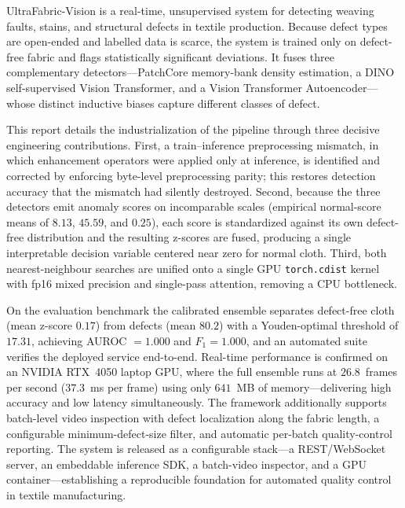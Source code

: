 \vspace{-1cm}


UltraFabric-Vision is a real-time, unsupervised system for detecting weaving faults, stains, and structural defects in textile production. Because defect types are open-ended and labelled data is scarce, the system is trained only on defect-free fabric and flags statistically significant deviations. It fuses three complementary detectors---PatchCore memory-bank density estimation, a DINO self-supervised Vision Transformer, and a Vision Transformer Autoencoder---whose distinct inductive biases capture different classes of defect.

This report details the industrialization of the pipeline through three decisive engineering contributions. First, a train--inference preprocessing mismatch, in which enhancement operators were applied only at inference, is identified and corrected by enforcing byte-level preprocessing parity; this restores detection accuracy that the mismatch had silently destroyed. Second, because the three detectors emit anomaly scores on incomparable scales (empirical normal-score means of $8.13$, $45.59$, and $0.25$), each score is standardized against its own defect-free distribution and the resulting z-scores are fused, producing a single interpretable decision variable centered near zero for normal cloth. Third, both nearest-neighbour searches are unified onto a single GPU \texttt{torch.cdist} kernel with fp16 mixed precision and single-pass attention, removing a CPU bottleneck.

On the evaluation benchmark the calibrated ensemble separates defect-free cloth (mean z-score $0.17$) from defects (mean $80.2$) with a Youden-optimal threshold of $17.31$, achieving AUROC $=1.000$ and $F_1 = 1.000$, and an automated suite verifies the deployed service end-to-end. Real-time performance is confirmed on an NVIDIA RTX~4050 laptop GPU, where the full ensemble runs at $26.8$~frames per second ($37.3$~ms per frame) using only $641$~MB of memory---delivering high accuracy and low latency simultaneously. The framework additionally supports batch-level video inspection with defect localization along the fabric length, a configurable minimum-defect-size filter, and automatic per-batch quality-control reporting. The system is released as a configurable stack---a REST/WebSocket server, an embeddable inference SDK, a batch-video inspector, and a GPU container---establishing a reproducible foundation for automated quality control in textile manufacturing.

\pagebreak